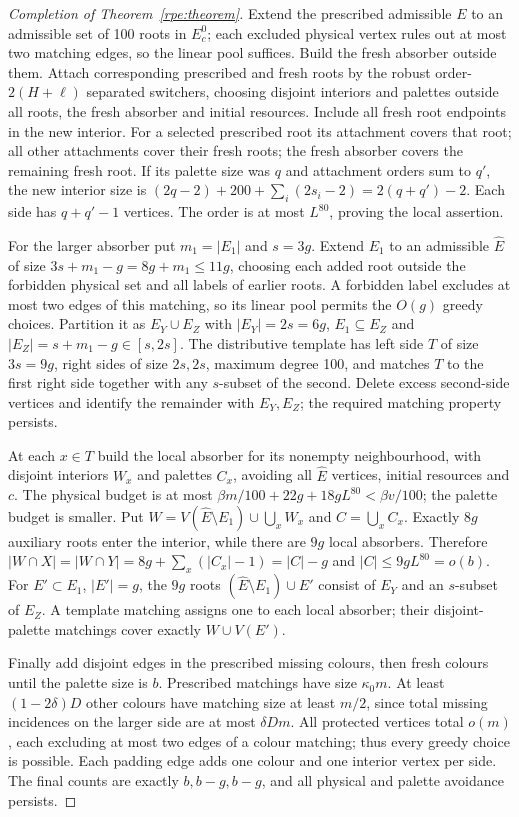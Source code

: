\begin{proof}[Completion of Theorem~\ref{rpe:theorem}]
Extend the prescribed admissible $E$ to an admissible set of
100 roots in $E_c^0$; each excluded physical vertex rules out at most two matching edges,
so the linear pool suffices. Build the fresh absorber outside them.
Attach corresponding prescribed and fresh roots by the robust
order-$2(H+\ell)$ separated switchers, choosing disjoint interiors and palettes outside all roots, the fresh absorber and initial
resources. Include all fresh root endpoints in the new interior.
For a selected prescribed root its attachment covers that root;
all other attachments cover their fresh roots; the fresh absorber
covers the remaining fresh root. If its palette size was $q$ and attachment orders sum to $q'$, the new interior size is $(2q-2)+200+\sum_i(2s_i-2)=2(q+q')-2$. Each side has $q+q'-1$ vertices. The order is at most $L^{80}$, proving the local assertion.

For the larger absorber put $m_1=|E_1|$ and $s=3g$. Extend $E_1$ to an admissible $\widehat{E}$ of size $3s+m_1-g=8g+m_1\le11g$, choosing each added root outside the forbidden physical set and
all labels of earlier roots. A forbidden label excludes at most
two edges of this matching, so its linear pool permits the $O(g)$ greedy choices. Partition it as $E_Y\cup{}E_Z$ with $|E_Y|=2s=6g$, $E_1\subseteq{}E_Z$ and $|E_Z|=s+m_1-g\in[s,2s]$. The distributive template
\cite[Lemma 2.1]{Montgomery} has left side $T$ of size $3s=9g$, right sides of size $2s,2s$, maximum degree 100, and matches $T$ to the first right side together with any $s$-subset of the second. Delete excess second-side vertices and identify the remainder with $E_Y,E_Z$; the required matching property persists.

At each $x\in{}T$ build the local absorber for its nonempty neighbourhood, with disjoint interiors $W_x$ and palettes $C_x$, avoiding all $\widehat{E}$ vertices, initial resources and $c$. The physical budget is at most $\beta{}m/100+22g+18gL^{80}<\beta{}v/100$; the palette budget is smaller. Put $W=V(\widehat{E}\setminus{}E_1)\cup\bigcup_xW_x$ and $C=\bigcup_xC_x$. Exactly $8g$ auxiliary roots enter the interior, while there are $9g$ local absorbers. Therefore $|W\cap{}X|=|W\cap{}Y|=8g+\sum_x(|C_x|-1)=|C|-g$ and $|C|\le9gL^{80}=o(b)$. For $E'\subset{}E_1$, $|E'|=g$, the $9g$ roots $(\widehat{E}\setminus{}E_1)\cup{}E'$ consist of $E_Y$ and an $s$-subset of $E_Z$. A template matching assigns one to each local absorber; their disjoint-palette matchings cover exactly $W\cup{}V(E')$.

Finally add disjoint edges in the prescribed missing colours, then
fresh colours until the palette size is $b$. Prescribed matchings have size $\kappa_0m$. At least $(1-2\delta)D$ other colours have matching size at least $m/2$, since total missing incidences on the larger side are at most $\delta{}Dm$. All protected vertices total $o(m)$, each excluding at most two edges of a colour matching; thus every greedy choice is possible. Each padding edge adds one
colour and one interior vertex per side. The final counts are
exactly $b,b-g,b-g$, and all physical and palette avoidance persists.
\end{proof}

